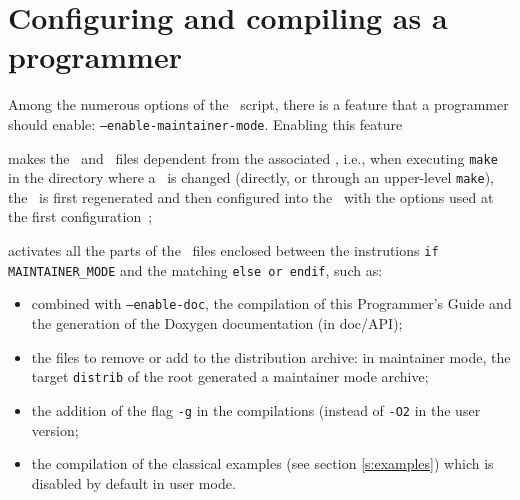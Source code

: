 \section{Configuring and compiling as a programmer}

Among the numerous options of the \configure\ script, there is a feature that
a programmer should enable: \texttt{--enable-maintainer-mode}. Enabling this feature
\begin{description}
\item{}makes the \make\ and \makein\ files dependent from the associated \makeam,
    i.e., when executing \texttt{make} in the directory where a \makeam\ is
    changed (directly, or through an upper-level \texttt{make}), the \makein\ is
    first regenerated and then configured into the \make\ with the options used
    at the first configuration~;
\item{}activates all the parts of the \makeam\ files enclosed between the
    instrutions \texttt{\footnotesize if MAINTAINER\_MODE} and the matching
    \texttt{\footnotesize else or endif}, such as:
    \begin{itemize}
    \item{combined with \texttt{--enable-doc}, the compilation of this
        Programmer's Guide and the generation of the Doxygen documentation (in
        doc/API);}
    \item{the files to remove or add to the distribution archive: in maintainer
        mode, the target \texttt{distrib} of the root \make generated a
        maintainer mode archive;}
    \item{the addition of the flag \texttt{-g} in the compilations (instead of
        \texttt{-O2} in the user version;}
    \item{the compilation of the classical examples (see section
        \ref{s:examples}) which is disabled by default in user mode.}
    \end{itemize}
\end{description}

